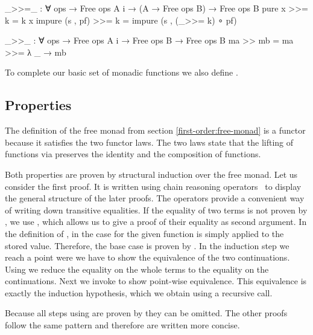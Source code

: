 \begin{code}
_>>=_ : ∀ {ops} → Free ops A {i} → (A → Free ops B) → Free ops B
pure x           >>= k = k x
impure (s , pf)  >>= k = impure (s , (_>>= k) ∘ pf)

_>>_ : ∀ {ops} → Free ops A {i} → Free ops B → Free ops B
ma >> mb = ma >>= λ _ → mb
\end{code}
To complete our basic set of monadic functions we also define .


\subsection{Properties}
\label{first-order:free-monad:properties}

The definition of the free monad from section \ref{first-order:free-monad} is a
functor because it satisfies the two functor laws.
The two laws state that the lifting of functions via 
preserves the identity and the composition of functions.

Both properties are proven by structural induction over the free monad.
Let us consider the first proof.
It is written using chain reasoning operators~\cite{norell:thesis} to display
the general structure of the later proofs.
The operators provide a convenient way of writing down transitive equalities.
If the equality of two terms is not proven by ,
we use , which allows us to give a proof of their
equality as second argument.
In the definition of \AgdaFunction{<\$>}, in the case for
 the given function is simply applied to the
stored value.
Therefore, the base case is proven by .
In the induction step we reach a point were we have to show the equivalence of
the two continuations.
Using  we reduce the equality on the whole terms to the
equality on the continuations.
Next we invoke  to show point-wise equivalence.
This equivalence is exactly the induction hypothesis, which we obtain using a
recursive call.

Because all steps using  are proven by
 they can be omitted.
The other proofs follow the same pattern and therefore are written more concise.

